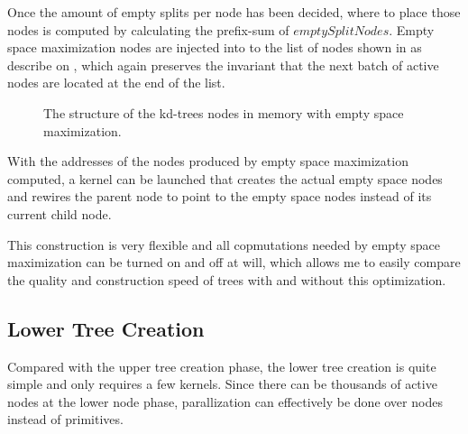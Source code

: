 Once the amount of empty splits per node has been decided, where to
place those nodes is computed by calculating the prefix-sum of
$emptySplitNodes$. Empty space maximization nodes are injected into to
the list of nodes shown in  as describe on
, which again preserves the invariant
that the next batch of active nodes are located at the end of the
list.

\begin{figure}
  \centering
  \caption{The structure of the kd-trees nodes in memory with empty
    space maximization.}
  \label{fig:emptyNodeStructure}
\end{figure}



With the addresses of the nodes produced by empty space maximization
computed, a kernel can be launched that creates the actual empty space
nodes and rewires the parent node to point to the empty space nodes
instead of its current child node. 

This construction is very flexible and all copmutations needed by
empty space maximization can be turned on and off at will, which
allows me to easily compare the quality and construction speed of
trees with and without this optimization.

\subsection{Lower Tree Creation}\label{sec:lowerNodes}

Compared with the upper tree creation phase, the lower tree creation
is quite simple and only requires a few kernels. Since there can be
thousands of active nodes at the lower node phase, parallization can
effectively be done over nodes instead of primitives.

